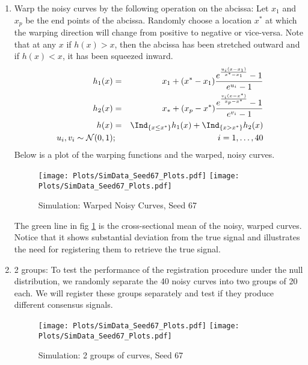 \begin{enumerate}
\item Warp the noisy curves by the following operation on the abcissa: Let $x_1$ and $x_p$ be the end points of the abcissa. Randomly choose a location $x^*$ at which the warping direction will change from positive to negative or vice-versa. Note that at any $x$ if $h(x) > x$, then the abcissa has been stretched outward and if $h(x) < x$, it has been squeezed inward. 
\begin{eqnarray*}
h_1(x) &=& x_1 + (x^* - x_1) \frac{e^{\frac{u_i(x - x_1)}{x^* - x_1}} - 1}{e^{u_i} - 1} \\
h_2(x) &=& x_* + (x_p - x^*) \frac{e^{\frac{v_i(x - x^*)}{x_p - x^*}} - 1}{e^{v_i} - 1} \\
h(x) &=& \Ind_{\{ x \le x^*\}} h_1(x) + \Ind_{\{ x > x^*\}} h_2(x) \\
  \ u_i, v_i \sim \mathcal{N}(0, 1)  &;& i = 1, \dots, 40
\end{eqnarray*}
Below is a plot of the warping functions and the warped, noisy curves.
\begin{figure}[H]
\begin{center}
\texttt{[image: Plots/SimData\_Seed67\_Plots.pdf]}
\texttt{[image: Plots/SimData\_Seed67\_Plots.pdf]}
\end{center}
\caption{Simulation: Warped Noisy Curves, Seed 67}
\label{fig:FigSim_Warped}
\end{figure}
The green line in fig \ref{fig:FigSim_Warped} is the cross-sectional mean of the noisy, warped curves. Notice that it shows substantial deviation from the true signal and illustrates the need for registering them to retrieve the true signal.

\item 2 groups: To test the performance of the registration procedure under the null distribution, we randomly separate the 40 noisy curves into two groups of 20 each. We will register these groups separately and test if they produce different consensus signals. 
\begin{figure}[H]
\begin{center}
\texttt{[image: Plots/SimData\_Seed67\_Plots.pdf]}
\texttt{[image: Plots/SimData\_Seed67\_Plots.pdf]}
\end{center}
\caption{Simulation: 2 groups of curves, Seed 67}
\label{fig:FigSim_2groups}
\end{figure}

\end{enumerate}


